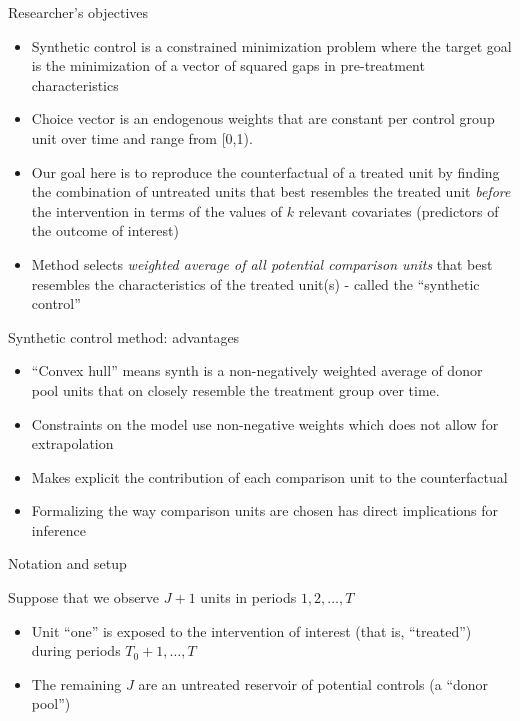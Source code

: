 \documentclass{beamer}
\begin{document}
\begin{frame}{Researcher's objectives}

\begin{itemize}
	\item Synthetic control is a constrained minimization problem where the target goal is the minimization of a vector of squared gaps in pre-treatment characteristics
	\item Choice vector is an endogenous weights that are constant per control group unit over time and range from [0,1). 
	\item Our goal here is to reproduce the counterfactual of a treated unit by finding the combination of untreated units that best resembles the treated unit \emph{before} the intervention in terms of the values of $k$ relevant covariates (predictors of the outcome of interest)
	\item Method selects \emph{weighted average of all potential comparison units} that best resembles the characteristics of the treated unit(s) - called the ``synthetic control''
\end{itemize}

\end{frame}



\begin{frame}{Synthetic control method: advantages}
	
	\begin{itemize}
	\item ``Convex hull'' means synth is a non-negatively weighted average of donor pool units that on closely resemble the treatment group over time.
	\item Constraints on the model use non-negative weights which does not allow for extrapolation 
	\item Makes explicit the contribution of each comparison unit to the counterfactual 
	\item Formalizing the way comparison units are chosen has direct implications for inference
	\end{itemize}
\end{frame}




\begin{frame}{Notation and setup}
	
Suppose that we observe $J+1$ units in periods $1, 2, \dots, T$
		\begin{itemize}
		\item Unit ``one'' is exposed to the intervention of interest (that is, ``treated'') during periods $T_0+1, \dots, T$
		\item The remaining $J$ are an untreated reservoir of potential controls (a ``donor pool'')
		\end{itemize}	
\end{frame}
\end{document}
